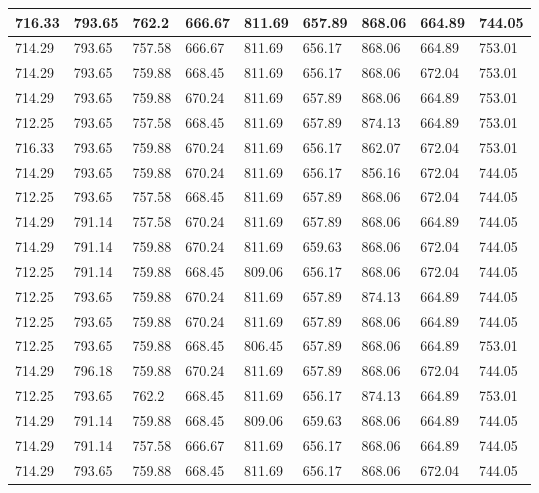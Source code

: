 \begin{longtable}{|l|l|l|l|l|l|l|l|l|}
		716.33   & 793.65  & 762.2   & 666.67  & 811.69 & 657.89  & 868.06   & 664.89  & 744.05  \\ \hline
		714.29   & 793.65  & 757.58  & 666.67  & 811.69 & 656.17  & 868.06   & 664.89  & 753.01  \\ \hline
		714.29   & 793.65  & 759.88  & 668.45  & 811.69 & 656.17  & 868.06   & 672.04  & 753.01  \\ \hline
		714.29   & 793.65  & 759.88  & 670.24  & 811.69 & 657.89  & 868.06   & 664.89  & 753.01  \\ \hline
		712.25   & 793.65  & 757.58  & 668.45  & 811.69 & 657.89  & 874.13   & 664.89  & 753.01  \\ \hline
		716.33   & 793.65  & 759.88  & 670.24  & 811.69 & 656.17  & 862.07   & 672.04  & 753.01  \\ \hline
		714.29   & 793.65  & 759.88  & 670.24  & 811.69 & 656.17  & 856.16   & 672.04  & 744.05  \\ \hline
		712.25   & 793.65  & 757.58  & 668.45  & 811.69 & 657.89  & 868.06   & 672.04  & 744.05  \\ \hline
		714.29   & 791.14  & 757.58  & 670.24  & 811.69 & 657.89  & 868.06   & 664.89  & 744.05  \\ \hline
		714.29   & 791.14  & 759.88  & 670.24  & 811.69 & 659.63  & 868.06   & 672.04  & 744.05  \\ \hline
		712.25   & 791.14  & 759.88  & 668.45  & 809.06 & 656.17  & 868.06   & 672.04  & 744.05  \\ \hline
		712.25   & 793.65  & 759.88  & 670.24  & 811.69 & 657.89  & 874.13   & 664.89  & 744.05  \\ \hline
		712.25   & 793.65  & 759.88  & 670.24  & 811.69 & 657.89  & 868.06   & 664.89  & 744.05  \\ \hline
		712.25   & 793.65  & 759.88  & 668.45  & 806.45 & 657.89  & 868.06   & 664.89  & 753.01  \\ \hline
		714.29   & 796.18  & 759.88  & 670.24  & 811.69 & 657.89  & 868.06   & 672.04  & 744.05  \\ \hline
		712.25   & 793.65  & 762.2   & 668.45  & 811.69 & 656.17  & 874.13   & 664.89  & 753.01  \\ \hline
		714.29   & 791.14  & 759.88  & 668.45  & 809.06 & 659.63  & 868.06   & 664.89  & 744.05  \\ \hline
		714.29   & 791.14  & 757.58  & 666.67  & 811.69 & 656.17  & 868.06   & 664.89  & 744.05  \\ \hline
		714.29   & 793.65  & 759.88  & 668.45  & 811.69 & 656.17  & 868.06   & 672.04  & 744.05  \\ \hline

\end{longtable}

